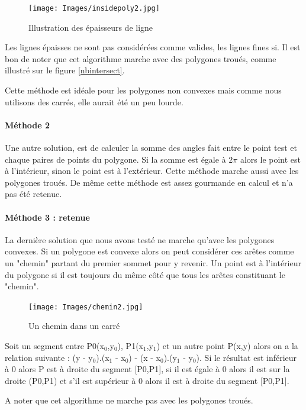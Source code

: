\documentclass[a4paper,12pt]{report}
\begin{document}
\begin{figure}[h]
\centering
\texttt{[image: Images/insidepoly2.jpg]}
\caption{Illustration des épaisseurs de ligne}
\end{figure}
\vspace{0.5cm}

Les lignes épaisses ne sont pas considérées comme valides, les lignes fines si.
Il est bon de noter que cet algorithme marche avec des polygones troués, comme illustré sur le figure \ref{nbintersect}.

Cette méthode est idéale pour les polygones non convexes mais comme nous utilisons des carrés, elle aurait été un peu lourde.

\paragraph{Méthode 2 }
Une autre solution, est de calculer la somme des angles fait entre le point test et chaque paires de points du polygone. Si la somme est égale à $2\pi$ alors le point est à l'intérieur, sinon le point est à l'extérieur. 
Cette méthode marche aussi avec les polygones troués.
De même cette méthode est assez gourmande en calcul et n'a pas été retenue.

\paragraph{Méthode 3 : retenue}
La dernière solution que nous avons testé ne marche qu'avec les polygones convexes. Si un polygone est convexe alors on peut considérer ces arêtes comme un "chemin" partant du premier sommet pour y revenir. 
Un point est à l'intérieur du polygone si il est toujours du même côté que tous les arêtes constituant le "chemin".

\begin{figure}[h]
\centering
\texttt{[image: Images/chemin2.jpg]}
\caption{Un chemin dans un carré}
\end{figure}
\vspace{0.5cm}

Soit un segment entre P0(x$_{0}$,y$_{0}$), P1(x$_{1}$,y$_{1}$) et un autre point P(x,y) alors on a la relation suivante : (y - y$_{0}$).(x$_{1}$ - x$_{0}$) - (x - x$_{0}$).(y$_{1}$ - y$_{0}$).
Si le résultat est inférieur à 0 alors P est à droite du segment [P0,P1], si il est égale à 0 alors il est sur la droite (P0,P1) et s'il est supérieur à 0 alors il est à droite du segment [P0,P1].

A noter que cet algorithme ne marche pas avec les polygones troués. 
\end{document}
